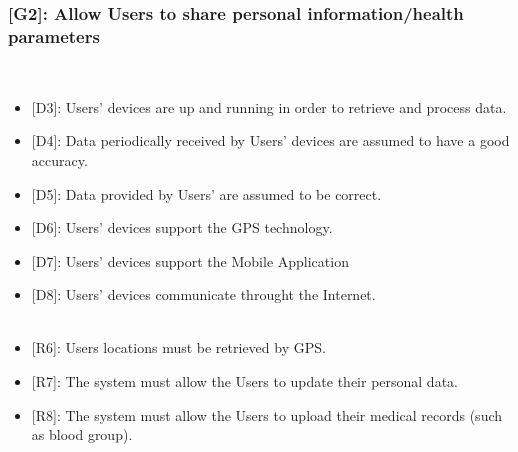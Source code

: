 \documentclass[12pt,a4paper]{article}
\begin{document}
	\subsubsection*{{[}{G2}{]}: Allow Users to share personal information/health parameters}
	\begin{itemize}\\
		\begin{itemize}
			\item {[D3]}: Users' devices are up and running in order to retrieve and process data.
			\item {[D4]}: Data periodically received by Users' devices are assumed to have a good accuracy.
			\item {[D5]}: Data provided by Users' are assumed to be correct. 
			\item {[D6]}: Users' devices support the GPS technology.
			\item {[D7]}: Users' devices support the Mobile Application 
			\item {[D8]}: Users' devices communicate throught the Internet.
			\\ \\
			\item {[R6]}: Users locations must be retrieved by GPS.
			\item {[R7]}: The system must allow the Users to update their personal data.
			\item {[R8]}: The system must allow the Users to upload their medical records (such as blood group).
		\end{itemize} 
	\end{itemize}
\end{document}
